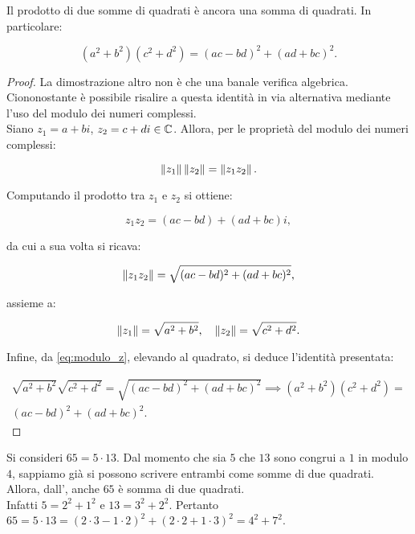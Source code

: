 \documentclass[11pt]{scrbook}
\begin{document}
\begin{proposition}
    \label{prop:fibonacci}
    Il prodotto di due somme di quadrati è ancora una
    somma di quadrati. In particolare:

    \[ (a^2+b^2)(c^2+d^2)=(ac-bd)^2+(ad+bc)^2. \]
\end{proposition}

\begin{proof}
    La dimostrazione altro non è che una banale verifica
    algebrica. Ciononostante è possibile risalire a questa
    identità in via alternativa mediante l'uso
    del modulo dei numeri complessi. \\

    Siano $z_1=a+bi$, $z_2=c+di \in \mathbb C$. Allora, per le proprietà
    del modulo dei numeri complessi:

    \begin{equation}
        \label{eq:modulo_z}
        \left\lVert z_1 \right\rVert\left\lVert z_2 \right\rVert=\left\lVert z_1z_2 \right\rVert.
    \end{equation}


    Computando il prodotto tra $z_1$ e $z_2$ si ottiene:

    \[ z_1z_2 = (ac-bd) + (ad+bc)i, \]

    da cui a sua volta si ricava:

    \[ \left\lVert z_1z_2 \right\rVert = \sqrt{(ac-bd)^2 + (ad+bc)^2}, \]

    assieme a:

    \[ \left\lVert z_1 \right\rVert=\sqrt{a^2+b^2}, \quad \left\lVert z_2 \right\rVert=\sqrt{c^2+d^2}. \]

    Infine, da \eqref{eq:modulo_z}, elevando al quadrato, si deduce l'identità
    presentata:

    \begin{multline*}
        \sqrt{a^2+b^2}\sqrt{c^2+d^2}=\sqrt{(ac-bd)^2 + (ad+bc)^2} \implies (a^2+b^2)(c^2+d^2)= \\ (ac-bd)^2+(ad+bc)^2.
    \end{multline*}
\end{proof}

\begin{example}
    Si consideri $65=5 \cdot 13$. Dal momento che sia $5$
    che $13$ sono congrui a $1$ in modulo $4$, sappiamo
    già si possono scrivere entrambi come somme di due
    quadrati. Allora, dall',
    anche $65$ è somma di due quadrati. \\

    Infatti $5=2^2+1^2$ e $13=3^2+2^2$. Pertanto
    $65=5\cdot 13=(2\cdot3-1\cdot2)^2 + (2\cdot2+1\cdot3)^2=4^2+7^2$.
\end{example}
\end{document}
